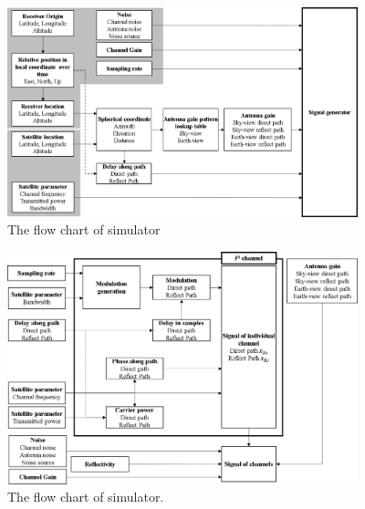 \begin{figure}[t!]
	\centering
	\includegraphics[width=4in]{pdf/simu_chart1.jpg}
	\caption{The flow chart of simulator }
	\centering
	\label{fig:Simu_flow_chart}
\end{figure}
\begin{figure}[t!]
	\centering
	\includegraphics[width=4in]{pdf/simu_chart2.jpg}
	\caption{The flow chart of simulator. }
	\centering
	\label{fig:Simu_flow_chart}
\end{figure}
